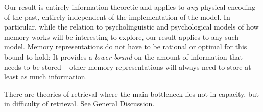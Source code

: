 Our result is entirely information-theoretic and applies to \emph{any} physical encoding of the past, entirely independent of the implementation of the model. %
In particular, while the relation to psycholinguistic and psychological models of how memory works will be interesting to explore, our result applies to any such model.
Memory representations do not have to be rational or optimal for this bound to hold:
It provides a \emph{lower bound} on the amount of information that needs to be stored -- other memory representations will always need to store at least as much information.



There are theories of retrieval where the main bottleneck lies not in capacity, but in difficulty of retrieval. See General Discussion.




